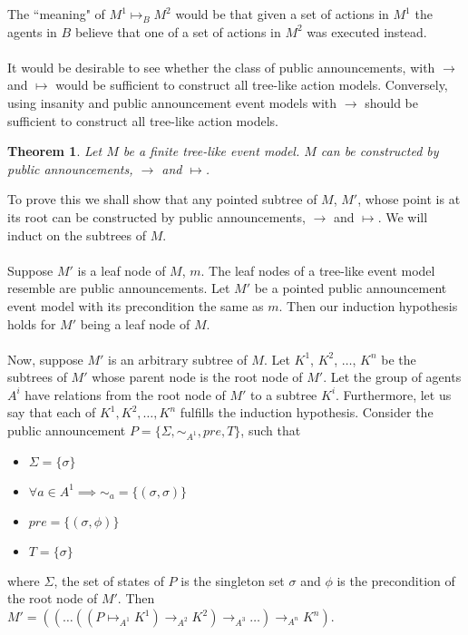 \documentclass[12pt, a4paper, titlepage]{scrartcl}
\newtheorem{thm}{Theorem}
\begin{document}
The ``meaning" of $M^1 \mapsto_B M^2$ would be that given a set of actions in
$M^1$ the agents in $B$ believe that one of a set of actions in $M^2$ was
executed instead.\\
\\
It would be desirable to see whether the class of public announcements, with
$\to$ and $\mapsto$ would be sufficient to construct all tree-like action
models.
Conversely, using insanity and public announcement event models with $\to$ should be sufficient to construct
all tree-like action models.
\begin{thm}
Let $M$ be a finite tree-like event model.
$M$ can be constructed by public announcements, $\to$ and $\mapsto$.
\end{thm}
To prove this we shall show that any pointed subtree of $M$, $M'$, whose point
is at its root can be constructed by public announcements, $\to$ and $\mapsto$.
We will induct on the subtrees of $M$.\\
\\
Suppose $M'$ is a leaf node of $M$, $m$.
The leaf nodes of a tree-like event model resemble are public announcements.
Let $M'$ be a pointed public announcement event model with its precondition the
same as $m$.
Then our induction hypothesis holds for $M'$ being a leaf node of $M$.\\
\\
Now, suppose $M'$ is an arbitrary subtree of $M$.
Let $K^1$, $K^2$, $\ldots$, $K^n$ be the subtrees of $M'$ whose parent node is
the root node of $M'$.
Let the group of agents $A^i$ have relations from the root node of $M'$ to a
subtree $K^i$.
Furthermore, let us say that each of $K^1, K^2, \ldots, K^n$ fulfills the
induction hypothesis.
Consider the public announcement $P = \{\Sigma,\sim_{A^1},pre,T\}$, such that
\begin{itemize}
  \item $\Sigma = \{ \sigma \}$
  \item $\forall a \in A^1 \implies \sim_a = \{ (\sigma,\sigma) \}$
  \item $pre = \{ (\sigma, \phi)\}$
  \item $T = \{\sigma\}$
\end{itemize}
where $\Sigma$, the set of states of $P$ is the singleton set $\sigma$ and 
$\phi$ is the precondition of the root node of $M'$.
Then $M' = ((\ldots((P \mapsto_{A^1} K^1) \to_{A^2} K^2) \to_{A^3}
      \ldots)\to_{A^n} K^n)$.\\
\\
\end{document}
